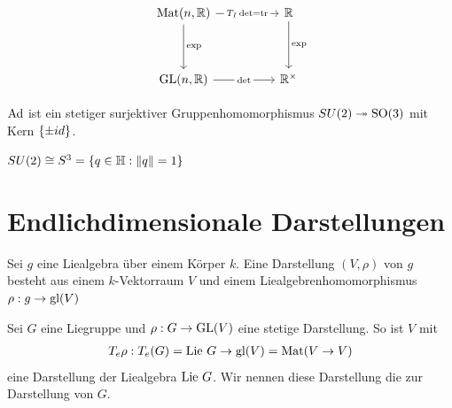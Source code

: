 \documentclass{report}
\begin{document}
\[\begin{tikzcd}
	{\Mat(n,\bR)} && \bR \\
	\\
	{\GL(n,\bR)} && \bR^\times
	\arrow["{T_I\det = \tr}"{description}, from=1-1, to=1-3]
	\arrow["\exp", from=1-1, to=3-1]
	\arrow["\exp", from=1-3, to=3-3]
	\arrow["\det"{description}, from=3-1, to=3-3]
\end{tikzcd}\]
\begin{theorem}
	$\textnormal{Ad}$ ist ein stetiger surjektiver Gruppenhomomorphismus $SU(2) \twoheadrightarrow \textnormal{SO}(3)$ mit Kern $\qty{\pm id}$.
\end{theorem}
\begin{proposition}
	$SU(2) \cong S^3 = \qty{q \in \mathbb{H}: \norm{q} = 1}$
\end{proposition}
\chapter{Endlichdimensionale Darstellungen}
\begin{definition}
	Sei $g$ eine Liealgebra über einem Körper $k$. Eine Darstellung $(V, \rho)$ von $g$ besteht aus einem $k$-Vektorraum $V$ und einem Liealgebrenhomomorphismus $\rho : g \to \textnormal{gl}(V)$
\end{definition}
\begin{definition}
	Sei $G$ eine Liegruppe und $\rho : G \to \textnormal{GL}(V)$ eine stetige Darstellung. So ist $V$ mit
	\begin{align*}
		T_e \rho : T_e(G) = \textnormal{Lie}~ G \to \textnormal{gl}(V) = \textnormal{Mat}(V \to V)
	\end{align*}
	eine Darstellung der Liealgebra $\textnormal{Lie}~ G$. Wir nennen diese Darstellung die  zur Darstellung von $G$. 
\end{definition}
\end{document}
